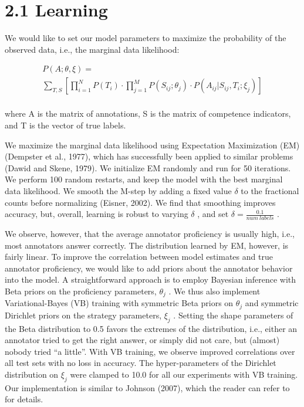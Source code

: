 \documentclass[
]{article}
\begin{document}
\section{2.1 Learning}\label{learning}

We would like to set our model parameters to maximize the probability of
the observed data, i.e., the marginal data likelihood:

\[
\begin{array}{l} P (A; \theta , \xi) = \\ \sum_ {T, S} \left[ \prod_ {i = 1} ^ {N} P (T _ {i}) \cdot \prod_ {j = 1} ^ {M} P (S _ {i j}; \theta_ {j}) \cdot P (A _ {i j} | S _ {i j}, T _ {i}; \xi_ {j}) \right] \\ \end{array}
\]

where A is the matrix of annotations, S is the matrix of competence
indicators, and T is the vector of true labels.

We maximize the marginal data likelihood using Expectation Maximization
(EM) (Dempster et al., 1977), which has successfully been applied to
similar problems (Dawid and Skene, 1979). We initialize EM randomly and
run for 50 iterations. We perform 100 random restarts, and keep the
model with the best marginal data likelihood. We smooth the M-step by
adding a fixed value \(\delta\) to the fractional counts before
normalizing (Eisner, 2002). We find that smoothing improves accuracy,
but, overall, learning is robust to varying \(\delta\) , and set
\(\delta = \frac{0.1}{num\ labels}\) .

We observe, however, that the average annotator proficiency is usually
high, i.e., most annotators answer correctly. The distribution learned
by EM, however, is fairly linear. To improve the correlation between
model estimates and true annotator proficiency, we would like to add
priors about the annotator behavior into the model. A straightforward
approach is to employ Bayesian inference with Beta priors on the
proficiency parameters, \(\theta_{j}\) . We thus also implement
Variational-Bayes (VB) training with symmetric Beta priors on
\(\theta_{j}\) and symmetric Dirichlet priors on the strategy
parameters, \(\xi_{j}\) . Setting the shape parameters of the Beta
distribution to 0.5 favors the extremes of the distribution, i.e.,
either an annotator tried to get the right answer, or simply did not
care, but (almost) nobody tried ``a little''. With VB training, we
observe improved correlations over all test sets with no loss in
accuracy. The hyper-parameters of the Dirichlet distribution on
\(\xi_{j}\) were clamped to 10.0 for all our experiments with VB
training. Our implementation is similar to Johnson (2007), which the
reader can refer to for details.
\end{document}
